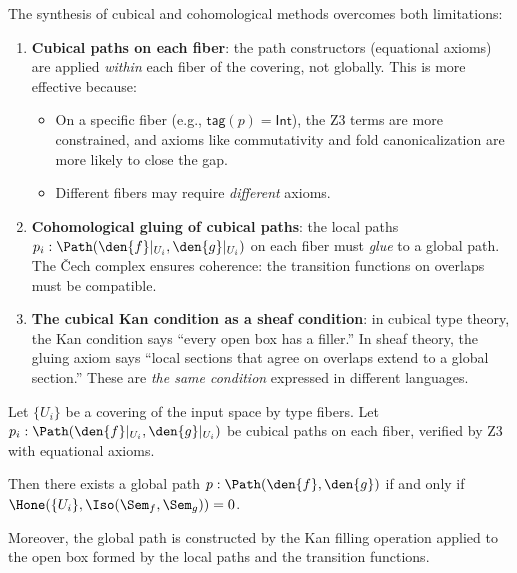 The synthesis of cubical and cohomological methods overcomes both
limitations:

\begin{enumerate}
  \item \textbf{Cubical paths on each fiber}: the path constructors
    (equational axioms) are applied \emph{within} each fiber of the
    covering, not globally.  This is more effective because:
    \begin{itemize}
      \item On a specific fiber (e.g., $\mathsf{tag}(p) = \mathsf{Int}$),
        the Z3 terms are more constrained, and axioms like commutativity
        and fold canonicalization are more likely to close the gap.
      \item Different fibers may require \emph{different} axioms.
    \end{itemize}

  \item \textbf{Cohomological gluing of cubical paths}: the local paths
    $p_i : \Path(\den{f}|_{U_i}, \den{g}|_{U_i})$ on each fiber must
    \emph{glue} to a global path.  The \v{C}ech complex ensures
    coherence: the transition functions on overlaps must be compatible.

  \item \textbf{The cubical Kan condition as a sheaf condition}: in
    cubical type theory, the Kan condition says ``every open box has a
    filler.''  In sheaf theory, the gluing axiom says ``local sections
    that agree on overlaps extend to a global section.''  These are
    \emph{the same condition} expressed in different languages.
\end{enumerate}

\begin{theorem}
\label{thm:synthesis}
Let $\{U_i\}$ be a covering of the input space by type fibers.
Let $p_i : \Path(\den{f}|_{U_i}, \den{g}|_{U_i})$ be cubical paths
on each fiber, verified by Z3 with equational axioms.

Then there exists a global path $p : \Path(\den{f}, \den{g})$
if and only if $\Hone(\{U_i\}, \Iso(\Sem_f, \Sem_g)) = 0$.

Moreover, the global path is constructed by the Kan filling operation
applied to the open box formed by the local paths and the transition
functions.
\end{theorem}

